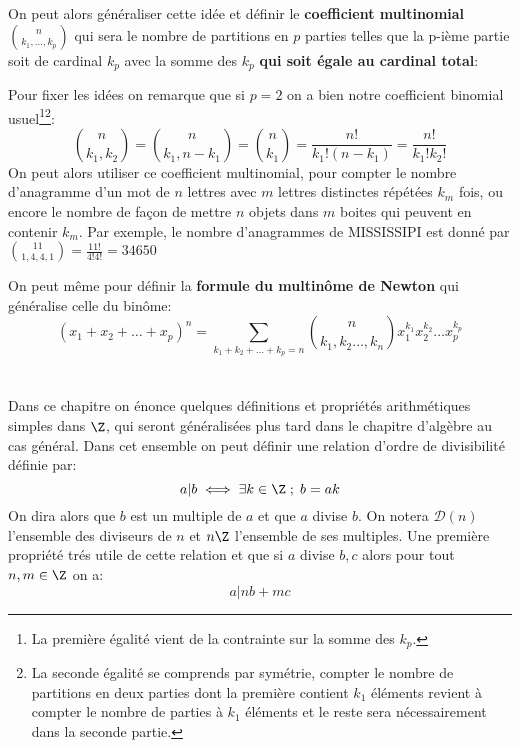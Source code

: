 On peut alors généraliser cette idée et définir le \textbf{coefficient multinomial} \(\binom{n}{k_1, \ldots, k_p}\) qui sera le nombre de partitions en \(p\) parties telles que la p-ième partie soit de cardinal \(k_p\) avec la somme des \(k_p\) \textbf{qui soit égale au cardinal total}:


Pour fixer les idées on remarque que si \(p = 2\) on a bien notre coefficient binomial usuel\footnote{
   La première égalité vient de la contrainte sur la somme des \(k_p\).
}\footnote{La seconde égalité se comprends par symétrie, compter le nombre de partitions en deux parties dont la première contient \(k_1\) éléments revient à compter le nombre de parties à \(k_1\) éléments et le reste sera nécessairement dans la seconde partie.}:
\[
   \binom{n}{k_1, k_2} =  \binom{n}{k_1, n - k_1} = \binom{n}{k_1} = \frac{n!}{k_1!(n-k_1)} = \frac{n!}{k_1!k_2!}
\]
On peut alors utiliser ce coefficient multinomial, pour compter le nombre d'anagramme d'un mot de \(n\) lettres avec \(m\) lettres distinctes répétées \(k_m\) fois, ou encore le nombre de façon de mettre \(n\) objets dans \(m\) boites qui peuvent en contenir \(k_m\).\+
Par exemple, le nombre d'anagrammes de MISSISSIPI est donné par \(\binom{11}{1 , 4, 4, 1}  = \frac{11!}{4!4!} = 34650\)\<

On peut même pour définir la \textbf{formule du multinôme de Newton} qui généralise celle du binôme:
\[
   (x_1 + x_2 + \ldots + x_p)^n = \sum_{k_1+k_2+\ldots+k_p = n} \binom{n}{k_1, k_2 \ldots, k_n} x_1^{k_1} x_2^{k_2} \ldots x_p^{k_p}
\]

\chapter*{}
Dans ce chapitre on énonce quelques définitions et propriétés arithmétiques simples dans \( \Z \), qui seront généralisées plus tard dans le chapitre d'algèbre au cas général. Dans cet ensemble on peut définir une relation d'ordre de divisibilité définie par:
\[ 
   a | b \iff \exists k \in \Z \; ; \; b = ak 
\]
On dira alors que \( b \) est un multiple de \( a \) et que \( a \) divise \( b \). On notera \( \mathcal{D}(n) \) l'ensemble des diviseurs de \( n \) et \( n\Z \) l'ensemble de ses multiples. Une première propriété trés utile de cette relation et que si \( a \) divise \( b, c \) alors pour tout \( n, m \in \Z \) on a:
\[ 
   a | nb + mc 
\]

